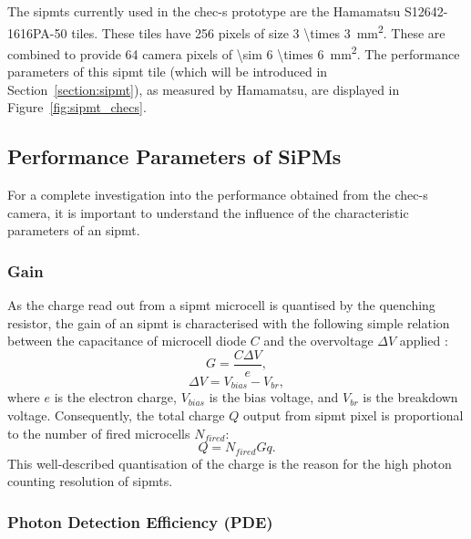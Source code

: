 The \glspl{sipmt} currently used in the \gls{chec-s} prototype are the Hamamatsu S12642-1616PA-50 tiles. These tiles have 256 pixels of size \SI[parse-numbers = false]{3 \times 3}{mm\squared}. These are combined to provide 64 camera pixels of \SI[parse-numbers = false]{\sim 6 \times 6}{mm\squared}. The performance parameters of this \gls{sipmt} tile (which will be introduced in Section~\ref{section:sipmt}), as measured by Hamamatsu, are displayed in Figure~\ref{fig:sipmt_checs}.

\subsection{Performance Parameters of SiPMs} \label{section:sipmt_parameters}

For a complete investigation into the performance obtained from the \gls{chec-s} camera, it is important to understand the influence of the characteristic parameters of an \gls{sipmt}.

\subsubsection{Gain}

As the charge read out from a \gls{sipmt} microcell is quantised by the quenching resistor, the gain of an \gls{sipmt} is characterised with the following simple relation between the capacitance of microcell diode $C$ and the overvoltage $\Delta V$ applied \cite{SensL2011}:
\begin{equation} \label{eq:sipmt_gain}
G = \frac{C \Delta V}{e},
\end{equation}
\begin{equation} \label{eq:sipmt_voltage}
\Delta V = V_{bias} - V_{br},
\end{equation}
where $e$ is the electron charge, $V_{bias}$ is the bias voltage, and $V_{br}$ is the breakdown voltage. Consequently, the total charge $Q$ output from \gls{sipmt} pixel is proportional to the number of fired microcells $N_{fired}$:
\begin{equation} \label{eq:sipmt_charge}
Q = N_{fired} G q.
\end{equation}
This well-described quantisation of the charge is the reason for the high photon counting resolution of \glspl{sipmt}.

\subsubsection{Photon Detection Efficiency (PDE)}


